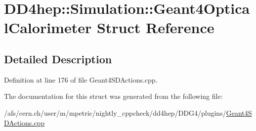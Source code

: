 \hypertarget{struct_d_d4hep_1_1_simulation_1_1_geant4_optical_calorimeter}{
\section{DD4hep::Simulation::Geant4OpticalCalorimeter Struct Reference}
\label{struct_d_d4hep_1_1_simulation_1_1_geant4_optical_calorimeter}
}


\subsection{Detailed Description}


Definition at line 176 of file Geant4SDActions.cpp.

The documentation for this struct was generated from the following file:\begin{DoxyCompactItemize}
\item 
/afs/cern.ch/user/m/mpetric/nightly\_\-cppcheck/dd4hep/DDG4/plugins/\hyperlink{_geant4_s_d_actions_8cpp}{Geant4SDActions.cpp}\end{DoxyCompactItemize}
